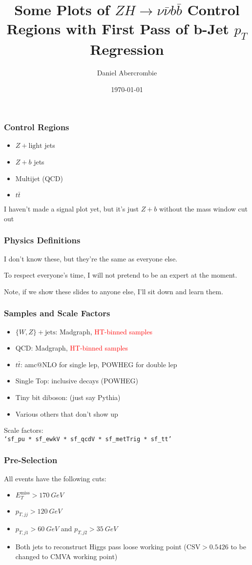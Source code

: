 \documentclass{beamer}
\author[D. Abercrombie]{
  Daniel Abercrombie
}
\title{\bf \sffamily Some Plots of $ZH \rightarrow \nu\bar{\nu} b\bar{b}$ Control Regions with First Pass of b-Jet $p_T$ Regression}
\date{\today}
\newcommand{\ttbar}{\ensuremath{t\bar{t}}}
\newcommand{\MET}{\ensuremath{E_{T}^{\mathrm{miss}}}}
\begin{document}
\begin{frame}[nonumbering]
  \titlepage
\end{frame}

\begin{frame}
  \frametitle{Control Regions}
  \begin{itemize}
  \item $Z + \mathrm{light}$ jets
  \item $Z + b$ jets
  \item Multijet (QCD)
  \item \ttbar
  \end{itemize}
  I haven't made a signal plot yet,
  but it's just $Z + b$ without the mass window cut out
\end{frame}

\begin{frame}
  \frametitle{Physics Definitions}
  I don't know these, but they're the same as everyone else.

  \vspace{12pt}

  To respect everyone's time, I will not pretend to be an expert at the moment.

  \vspace{12pt}

  Note, if we show these slides to anyone else, I'll sit down and learn them.
\end{frame}

\begin{frame}
  \frametitle{Samples and Scale Factors}
  \begin{itemize}
  \item $\{W,Z\} + \mathrm{jets}$: Madgraph, \textcolor{red}{HT-binned samples}
  \item QCD: Madgraph, \textcolor{red}{HT-binned samples}
  \item \ttbar: amc@NLO for single lep, POWHEG for double lep
  \item Single Top: inclusive decays (POWHEG)
  \item Tiny bit diboson: (just say Pythia)
  \item Various others that don't show up
  \end{itemize}

  Scale factors: \\ \centering \tt{`sf\_pu * sf\_ewkV * sf\_qcdV * sf\_metTrig * sf\_tt'}
\end{frame}

\begin{frame}
  \frametitle{Pre-Selection}
  All events have the following cuts:

  \begin{itemize}
  \item $\MET > \SI{170}{GeV}$
  \item $p_{T, jj} > \SI{120}{GeV}$
  \item $p_{T, j1} > \SI{60}{GeV}$ and $p_{T, j2} > \SI{35}{GeV}$
  \item Both jets to reconstruct Higgs pass loose working point
    ($\mathrm{CSV} > 0.5426$ to be changed to CMVA working point)
  \end{itemize}
\end{frame}
\end{document}
